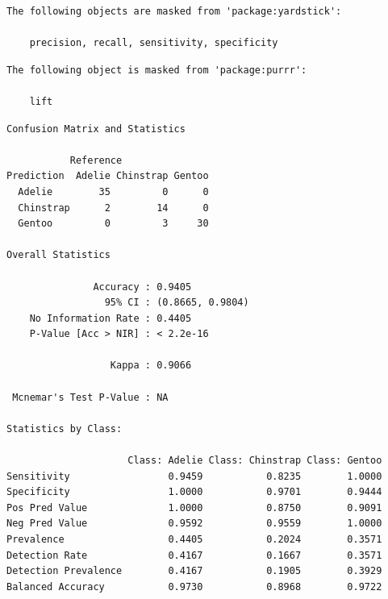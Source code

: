\documentclass[
  letterpaper,
  DIV=11,
  numbers=noendperiod]{scrreprt}
\newenvironment{Shaded}{\begin{snugshade}}{\end{snugshade}}
\newcommand{\AttributeTok}[1]{\textcolor[rgb]{0.40,0.45,0.13}{#1}}
\newcommand{\FunctionTok}[1]{\textcolor[rgb]{0.28,0.35,0.67}{#1}}
\newcommand{\NormalTok}[1]{\textcolor[rgb]{0.00,0.23,0.31}{#1}}
\newcommand{\OtherTok}[1]{\textcolor[rgb]{0.00,0.23,0.31}{#1}}
\newcommand{\SpecialCharTok}[1]{\textcolor[rgb]{0.37,0.37,0.37}{#1}}
\newcommand{\StringTok}[1]{\textcolor[rgb]{0.13,0.47,0.30}{#1}}
\begin{document}
\begin{verbatim}
The following objects are masked from 'package:yardstick':

    precision, recall, sensitivity, specificity
\end{verbatim}

\begin{verbatim}
The following object is masked from 'package:purrr':

    lift
\end{verbatim}

\begin{Shaded}
\end{Shaded}

\begin{verbatim}
Confusion Matrix and Statistics

           Reference
Prediction  Adelie Chinstrap Gentoo
  Adelie        35         0      0
  Chinstrap      2        14      0
  Gentoo         0         3     30

Overall Statistics
                                          
               Accuracy : 0.9405          
                 95% CI : (0.8665, 0.9804)
    No Information Rate : 0.4405          
    P-Value [Acc > NIR] : < 2.2e-16       
                                          
                  Kappa : 0.9066          
                                          
 Mcnemar's Test P-Value : NA              

Statistics by Class:

                     Class: Adelie Class: Chinstrap Class: Gentoo
Sensitivity                 0.9459           0.8235        1.0000
Specificity                 1.0000           0.9701        0.9444
Pos Pred Value              1.0000           0.8750        0.9091
Neg Pred Value              0.9592           0.9559        1.0000
Prevalence                  0.4405           0.2024        0.3571
Detection Rate              0.4167           0.1667        0.3571
Detection Prevalence        0.4167           0.1905        0.3929
Balanced Accuracy           0.9730           0.8968        0.9722
\end{verbatim}
\end{document}
